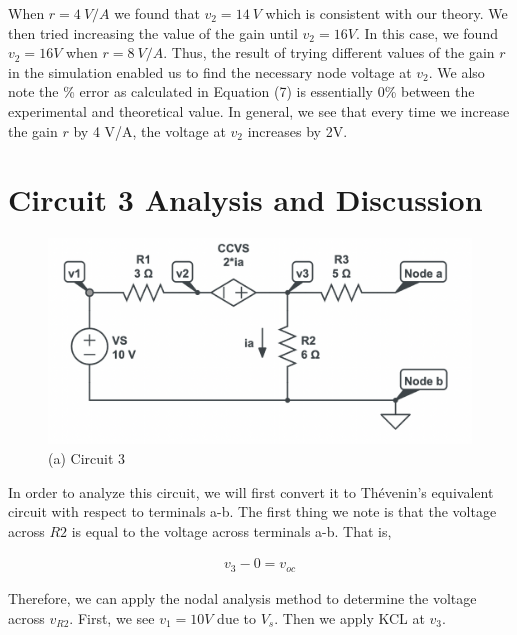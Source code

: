 \documentclass[12pt]{article}
\begin{document}
When $r = \SI{4}{V/A}$ we found that $v_2 = \SI{14}{V}$ which is consistent with our theory. We then tried increasing the value of the gain until $v_2 = 16V$. In this case, we found $v_2 = 16V$ when $r = \SI{8}{V/A}$. Thus, the result of trying different values of the gain $r$ in the simulation enabled us to find the necessary node voltage at $v_2$. We also note the \% error as calculated in Equation (7) is essentially 0\% between the experimental and theoretical value. In general, we see that every time we increase the gain $r$ by 4 V/A, the voltage at $v_2$ increases by 2V.

\section{Circuit 3 Analysis and Discussion}

\begin{figure}[H]
    \begin{center}
        \includegraphics[scale=0.6]{circuit-3.png}
        \caption { (a) Circuit 3}
    \end{center}
\end{figure}

In order to analyze this circuit, we will first convert it to Thévenin's equivalent circuit with respect to terminals a-b. The first thing we note is that the voltage across $R2$ is equal to the voltage across terminals a-b. That is,

\begin{equation*}
    \begin{split}
        v_3 - 0 = v_{oc} 
    \end{split}
\end{equation*}

Therefore, we can apply the nodal analysis method to determine the voltage across $v_{R2}$. First, we see $v_1 = 10V$ due to $V_s$. Then we apply KCL at $v_3$.
\end{document}

